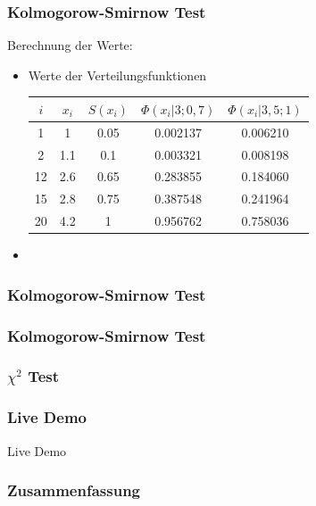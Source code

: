 \documentclass{beamer}
\begin{document}
\begin{frame}
\frametitle{Kolmogorow-Smirnow Test}
Berechnung der Werte:\\
	\begin{itemize}
		\item Werte der Verteilungsfunktionen
			\begin{table}[ht]
			\center
			\begin{tabular}{c|c|c|c|c}
			\label{tab:1}
			$i$ 	& $x_i$ 	& $S(x_i)$ 	& $\Phi (x_i|3;0,7)$ 	& $\Phi (x_i|3,5;1)$ 	\\
			\hline
			1	&	1	&	0.05	&	0.002137	&	0.006210	\\
			2	&	1.1	&	0.1	&	0.003321	&	0.008198	\\
			12	&	2.6	&	0.65	&	0.283855	&	0.184060	\\
			15	&	2.8	&	0.75	&	0.387548	&	0.241964	\\
			20	&	4.2	&	1	&	0.956762	&	0.758036	\\
			\end{tabular}
			\end{table}
		\item
	\end{itemize}
\end{frame}
\begin{frame}
\frametitle{Kolmogorow-Smirnow Test}
\end{frame}
\begin{frame}
\frametitle{Kolmogorow-Smirnow Test}
\end{frame}

\begin{frame}
\frametitle{$\chi^2$ Test}
\end{frame}

\begin{frame}
\frametitle{Live Demo}
\center
\Huge Live Demo
\end{frame}

\begin{frame}
\frametitle{Zusammenfassung}
\end{frame}
\end{document}
